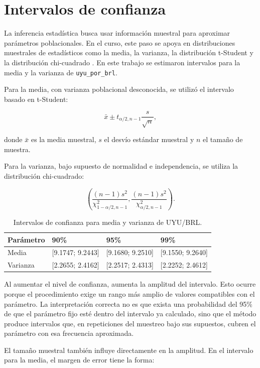 \section{Intervalos de confianza}

La inferencia estadística busca usar información muestral para aproximar parámetros poblacionales. En el curso, este paso se apoya en distribuciones muestrales de estadísticos como la media, la varianza, la distribución t-Student y la distribución chi-cuadrado \cite{curso_muestreo}. En este trabajo se estimaron intervalos para la media y la varianza de \texttt{uyu\_por\_brl}.

Para la media, con varianza poblacional desconocida, se utilizó el intervalo basado en t-Student:

\[
    \bar{x} \pm t_{\alpha/2,n-1}\frac{s}{\sqrt{n}},
\]

donde \(\bar{x}\) es la media muestral, \(s\) el desvío estándar muestral y \(n\) el tamaño de muestra.

Para la varianza, bajo supuesto de normalidad e independencia, se utiliza la distribución chi-cuadrado:

\[
    \left(
    \frac{(n-1)s^2}{\chi^2_{1-\alpha/2,n-1}},
    \frac{(n-1)s^2}{\chi^2_{\alpha/2,n-1}}
    \right).
\]

\begin{table}[H]
\centering
\footnotesize
\caption{Intervalos de confianza para media y varianza de UYU/BRL.}
\label{tab:intervalos-compactos}
\begin{tabular}{p{2.4cm}p{3.5cm}p{3.5cm}p{3.5cm}}
\toprule
Parámetro & 90\% & 95\% & 99\% \\
\midrule
Media & [9.1747; 9.2443] & [9.1680; 9.2510] & [9.1550; 9.2640] \\
Varianza & [2.2655; 2.4162] & [2.2517; 2.4313] & [2.2252; 2.4612] \\
\bottomrule
\end{tabular}
\end{table}

Al aumentar el nivel de confianza, aumenta la amplitud del intervalo. Esto ocurre porque el procedimiento exige un rango más amplio de valores compatibles con el parámetro. La interpretación correcta no es que exista una probabilidad del 95\% de que el parámetro fijo esté dentro del intervalo ya calculado, sino que el método produce intervalos que, en repeticiones del muestreo bajo sus supuestos, cubren el parámetro con esa frecuencia aproximada.

El tamaño muestral también influye directamente en la amplitud. En el intervalo para la media, el margen de error tiene la forma:

